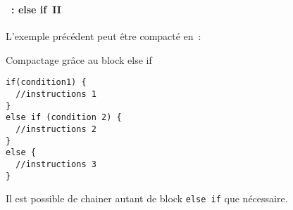 \begin{frame}[containsverbatim]
  \frametitle{\secname}
  \framesubtitle{\subsecname~: else if~II}

  L'exemple précédent peut être compacté en~:
  \begin{exampleblock}{Compactage grâce au block else if}
    \begin{verbatim}
if(condition1) {
  //instructions 1
}
else if (condition 2) {
  //instructions 2
}
else {
  //instructions 3
}\end{verbatim}
  \end{exampleblock}
  \par
  Il est possible de chainer autant de block \verb|else if| que nécessaire.
\end{frame}


